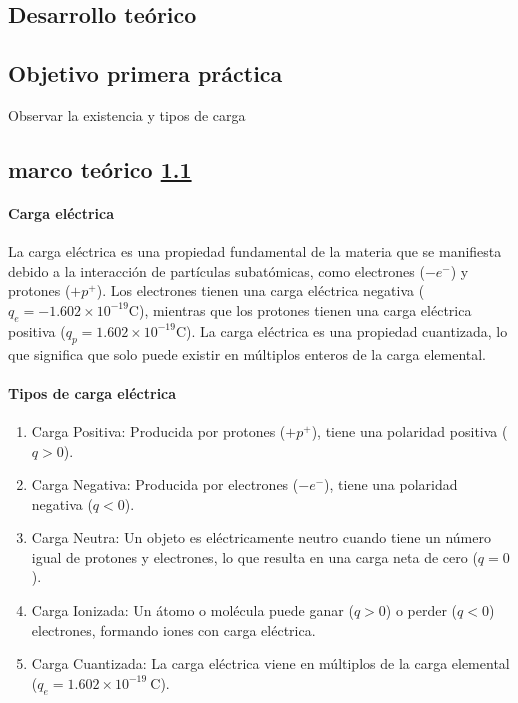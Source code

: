 \documentclass{article}
\begin{document}

\begin{multicols}{2}

\section{Desarrollo teórico}\label{Desarrollo Teorico}                              	%
\subsection{Objetivo primera práctica}\label{Objetivo primera práctica}
	Observar la existencia y tipos de carga
	\subsection{marco teórico \ref{Objetivo primera práctica}}
	\paragraph*{Carga eléctrica}
	La carga eléctrica es una propiedad fundamental de la materia que se manifiesta debido 
	a la interacción de partículas subatómicas, como electrones (\ensuremath{-e^{-}}) y protones 
	(\ensuremath{+p^{+}}). Los electrones tienen una carga eléctrica negativa
	(\ensuremath{q_{e}=-1.602\times 10^{-19}\mathrm{C}}), mientras que los protones
	tienen una carga eléctrica positiva (\ensuremath{q_{p}=1.602\times 10^{-19}\mathrm{C}}).
	La carga eléctrica es una propiedad cuantizada, lo que significa que solo puede existir 
	en múltiplos enteros de la carga elemental.

	\paragraph*{Tipos de carga eléctrica}
	\cite{Serway}
\begin{enumerate}
\item Carga Positiva: Producida por protones (\ensuremath{+p^{+}}), tiene una polaridad positiva (\ensuremath{q>0}).
\item Carga Negativa: Producida por electrones (\ensuremath{-e^{-}}), tiene una polaridad negativa (\ensuremath{q<0}).
\item Carga Neutra: Un objeto es eléctricamente neutro cuando tiene un número igual de protones y electrones, lo que resulta en una carga neta de cero (\ensuremath{q=0}).
\item Carga Ionizada: Un átomo o molécula puede ganar (\ensuremath{q>0}) o perder (\ensuremath{q<0}) electrones, formando iones con carga eléctrica.
\item Carga Cuantizada: La carga eléctrica viene en múltiplos de la carga elemental (\ensuremath{q_{e}=1.602\times 10^{-19}~\mathrm{C}}).
\end{enumerate}


\end{multicols}
\end{document}
